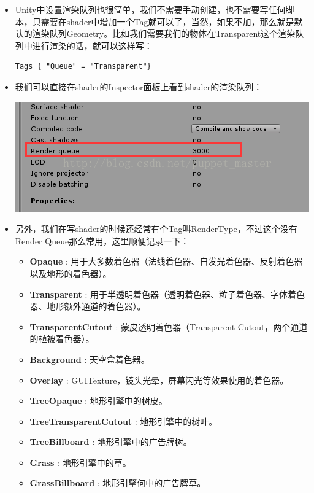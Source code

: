 \documentclass[9pt, b5paper]{article}
\begin{document}
\begin{itemize}
\item Unity中设置渲染队列也很简单，我们不需要手动创建，也不需要写任何脚本，只需要在shader中增加一个Tag就可以了，当然，如果不加，那么就是默认的渲染队列Geometry。比如我们需要我们的物体在Transparent这个渲染队列中进行渲染的话，就可以这样写：
\begin{verbatim}
Tags { "Queue" = "Transparent"}
\end{verbatim}
\item 我们可以直接在shader的Inspector面板上看到shader的渲染队列：

\includegraphics[width=.9\linewidth]{./pic/renderQueue.png}
\item 另外，我们在写shader的时候还经常有个Tag叫RenderType，不过这个没有Render Queue那么常用，这里顺便记录一下：
\begin{itemize}
\item \textbf{Opaque} : 用于大多数着色器（法线着色器、自发光着色器、反射着色器以及地形的着色器）。
\item \textbf{Transparent} : 用于半透明着色器（透明着色器、粒子着色器、字体着色器、地形额外通道的着色器）。
\item \textbf{TransparentCutout} : 蒙皮透明着色器（Transparent Cutout，两个通道的植被着色器）。
\item \textbf{Background} : 天空盒着色器。
\item \textbf{Overlay} : GUITexture，镜头光晕，屏幕闪光等效果使用的着色器。
\item \textbf{TreeOpaque} : 地形引擎中的树皮。
\item \textbf{TreeTransparentCutout} : 地形引擎中的树叶。
\item \textbf{TreeBillboard} : 地形引擎中的广告牌树。
\item \textbf{Grass} : 地形引擎中的草。
\item \textbf{GrassBillboard} : 地形引擎何中的广告牌草。
\end{itemize}
\end{itemize}
\end{document}
